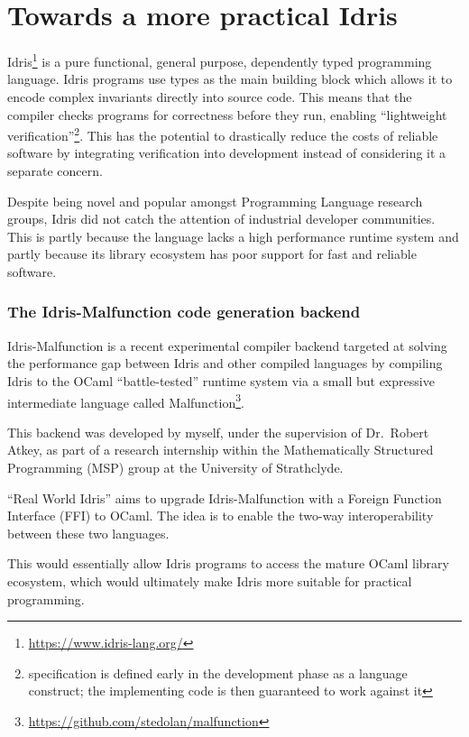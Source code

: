 \section{Towards a more practical Idris}

Idris\footnote{\url{https://www.idris-lang.org/}} is a pure functional,
general purpose, dependently typed programming language.
Idris programs use types as the main building block which allows it
to encode complex invariants directly into source code.
This means that the compiler checks programs for
correctness before they run, enabling
``lightweight verification''\footnote{specification is
	defined early in the development phase as a language construct;
	the implementing code is then guaranteed to work against it}.
This has the potential to drastically reduce the costs
of reliable software by integrating verification into development
instead of considering it a separate concern.

Despite being novel and popular amongst Programming Language research
groups, Idris did not catch the attention of industrial developer
communities.
This is partly because the language lacks a high performance
runtime system and partly because its library ecosystem has poor
support for fast and reliable software.

\subsubsection{The Idris-Malfunction code generation backend}

Idris-Malfunction is a recent experimental compiler backend targeted at
solving the performance gap between Idris and other compiled languages
by compiling Idris to the OCaml ``battle-tested'' runtime system
via a small but expressive intermediate language
called
Malfunction\footnote{\url{https://github.com/stedolan/malfunction}}.

This backend was developed by myself, under the
supervision of Dr.~Robert Atkey, as part of a research internship
within the Mathematically Structured Programming (MSP) group at the
University of Strathclyde.

``Real World Idris'' aims to upgrade Idris-Malfunction
with a Foreign Function Interface (FFI) to OCaml.
The idea is to enable the two-way interoperability between these two
languages.

This would essentially allow Idris programs to access the mature OCaml
library ecosystem, which would ultimately make Idris more suitable
for practical programming.

